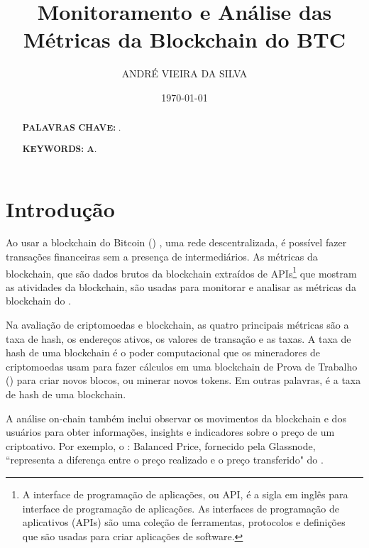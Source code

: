 \documentclass[a4paper,12pt]{article}
\title{ \textbf{\large Monitoramento e Análise das Métricas da Blockchain do BTC}}
\author{ANDRÉ VIEIRA DA SILVA}
\date{\today}
\begin{document}
\maketitle


\begin{abstract}
\textbf{PALAVRAS CHAVE: }.
\end{abstract}

\begin{abstract}

\textbf{KEYWORDS: A}.
\end{abstract}


\newpage
\tableofcontents
\newpage


\section{Introdução}
\hspace{0.5cm}Ao usar a blockchain do Bitcoin (\btc) \cite{nakamoto2008bitcoin}, uma rede descentralizada, 
é possível fazer transações financeiras sem a presença de intermediários. 
As métricas da blockchain, que são dados brutos da blockchain extraídos de 
APIs\footnote{A interface de programação de aplicações, ou API, é a sigla em inglês para interface 
de programação de aplicações. As interfaces de programação de aplicativos (APIs) são uma coleção de ferramentas, protocolos e definições que são usadas para criar aplicações de software.
} que mostram as atividades da blockchain, são usadas para monitorar e 
analisar as métricas da blockchain do \btc.

Na avaliação de criptomoedas e blockchain, as quatro principais métricas são 
a taxa de hash, os endereços ativos, os valores de transação e as taxas.
A taxa de hash de uma blockchain é o poder computacional que os mineradores 
de criptomoedas usam para fazer cálculos em uma blockchain de Prova de Trabalho (\pow)
para criar novos blocos, ou minerar novos tokens. Em outras palavras, é a taxa 
de hash de uma blockchain.

A análise on-chain também inclui observar os movimentos da blockchain e dos usuários 
para obter informações, insights e indicadores sobre o preço de um criptoativo. 
Por exemplo, o \btc: Balanced Price, fornecido pela Glassnode, ``representa a diferença 
entre o preço realizado e o preço transferido" do \btc. 
\end{document}
